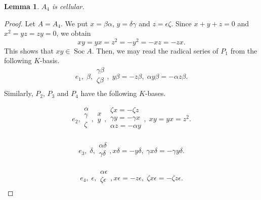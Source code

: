 \documentclass[12pt]{amsart}
\newtheorem{lem}[thm]{Lemma}
\numberwithin{equation}{thm}
\newcommand\Soc{\operatorname{Soc}}
\begin{document}
{%

\begin{lem}
\label{P A4}
$A_4$ is cellular.
\end{lem}
\begin{proof}
Let $A=A_4$. We put $x=\beta\alpha$, $y=\delta\gamma$ and $z=\epsilon\zeta$.
Since $x+y+z=0$ and $x^2=yz=zy=0$, we obtain
\[xy=yx=z^2=-y^2=-xz=-zx.\]
This shows that $xy\in \Soc A$.
Then, we may read the radical series of $P_1$ from the following $K$-basis.
\[
e_1,\; \beta,
\begin{array}{c}
\gamma\beta\\
\zeta\beta\\
\end{array},\;
y\beta=-z\beta,\; \alpha y \beta=-\alpha z \beta.
\] 
Similarly, $P_2$, $P_3$ and $P_4$ have the following $K$-bases.

\[e_2,
\begin{array}{c}
\alpha\\
\gamma\\
\zeta\\
\end{array},
\begin{array}{c}
x\\
y\\
\end{array},
\begin{array}{c}
\zeta x=-\zeta z\\
\gamma y=-\gamma x\\
\alpha z=-\alpha y\\
\end{array},\;
 xy=yx=z^2.
\] 

\[
e_3,\; \delta,
\begin{array}{c}
\alpha\delta\\
\gamma\delta\\
\end{array},
x\delta=-y\delta,\; \gamma x \delta=-\gamma y \delta.
\]

\[
e_4,\; \epsilon,
\begin{array}{c}
\alpha\epsilon\\
\zeta\epsilon\\
\end{array},
x\epsilon=-z\epsilon,\; \zeta x \epsilon=-\zeta z \epsilon.
\]


\end{proof}}
\end{document}
